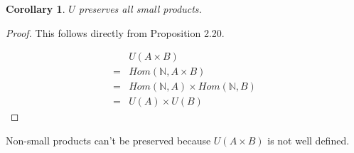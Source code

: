 \documentclass{article}
\newtheorem{corollary}{Corollary}
\begin{document}
\begin{enumerate}
    \begin{corollary}
      $U$ preserves all small products.
    \end{corollary}

    \begin{proof}

      This follows directly from Proposition 2.20.

      \begin{align*}
       & U(A \times B) \\
      =& Hom(\mathbb{N}, A \times B) \\
      =& Hom(\mathbb{N}, A) \times Hom(\mathbb{N}, B) \\
      =& U(A) \times U(B)
      \end{align*}

    \end{proof}

      Non-small products can't be preserved because $U(A \times B)$
      is not well defined.

      
    

    
    


\end{enumerate}
\end{document}
